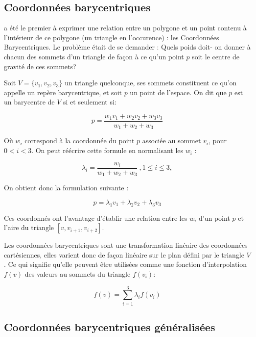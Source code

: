 \subsection{Coordonnées barycentriques}

\cite{Mob27} a été le premier à exprimer une relation entre un polygone et un
point contenu à l'intérieur de ce polygone (un triangle en l'occurence) : les
Coordonnées Barycentriques. Le problème était de se demander : Quels poids doit-
on donner à chacun des sommets d'un triangle de façon à ce qu'un point $p$ soit
le centre de gravité de ces sommets?

Soit $V = \{v_1, v_2, v_3\}$ un triangle quelconque, ses sommets constituent ce
qu'on appelle un repère barycentrique, et soit $p$ un point de l'espace. On dit
que $p$ est un barycentre de $V$ si et seulement si:

\begin{equation}
  p = \frac{w_1 v_1 + w_2 v_2 + w_3 v_3}{w_1+w_2+w_3}
\end{equation}

Où $w_i$ correspond à la coordonnée du point $p$ associée au sommet $v_i$, pour
$0 < i < 3$. On peut réécrire cette formule en normalisant les $w_i$ :

\begin{equation}
  \lambda_i = \frac{w_i}{w_1+w_2+w_3} ~, 1 \leq i \leq 3, 
\end{equation}

On obtient donc la formulation suivante :

\begin{equation}
  p = \lambda_1 v_1 + \lambda_2 v_2 + \lambda_3 v_3
\end{equation}

Ces coordonnés ont l'avantage d'établir une relation entre les $w_i$ d'un point
$p$ et l'aire du triangle $[v, v_{i+1}, v_{i+2}]$.

Les coordonnées barycentriques sont une transformation linéaire des coordonnées
cartésiennes, elles varient donc de façon linéaire sur le plan défini par le
triangle $V$. Ce qui signifie qu'elle peuvent être utilisées comme une fonction
d'interpolation $f(v)$ des valeurs au sommets du triangle $f(v_i)$:

\begin{equation}
  f(v) = \sum_{i=1}^{3} \lambda_i f(v_i)
\end{equation}

\subsection{Coordonnées barycentriques généralisées}

